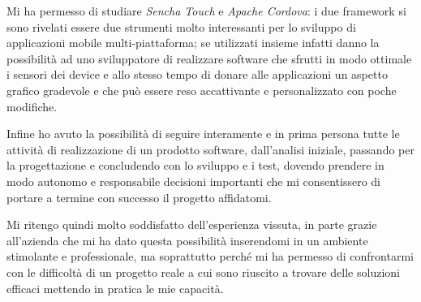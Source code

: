 Mi ha permesso di studiare \emph{Sencha Touch} e \emph{Apache Cordova}: i due framework si sono rivelati essere due strumenti molto interessanti per lo sviluppo di applicazioni mobile multi-piattaforma; se utilizzati insieme infatti danno la possibilità ad uno sviluppatore di realizzare software che sfrutti in modo ottimale i sensori dei device e allo stesso tempo  di donare alle applicazioni un aspetto grafico gradevole e che può essere reso accattivante e personalizzato con poche modifiche.

Infine ho avuto la possibilità di seguire interamente e in prima persona tutte le attività di realizzazione di un prodotto software, dall'analisi iniziale, passando per la progettazione e concludendo con lo sviluppo e i test, dovendo prendere in modo autonomo e responsabile decisioni importanti che mi consentissero di portare a termine con successo il progetto affidatomi.

Mi ritengo quindi molto soddisfatto dell'esperienza vissuta, in parte grazie all'azienda \myCompany che mi ha dato questa possibilità inserendomi in un ambiente stimolante e professionale, ma soprattutto perché mi ha permesso di confrontarmi con le difficoltà di un progetto reale a cui sono riuscito a trovare delle soluzioni efficaci mettendo in pratica le mie capacità.